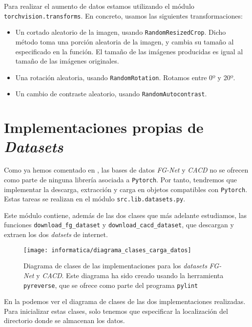 Para realizar el aumento de datos estamos utilizando el módulo \lstinline{torchvision.transforms}. En concreto, usamos las siguientes transformaciones:

\begin{itemize}
	\item Un cortado aleatorio de la imagen, usando \lstinline{RandomResizedCrop}. Dicho método toma una porción aleatoria de la imagen, y cambia su tamaño al especificado en la función. El tamaño de las imágenes producidas es igual al tamaño de las imágenes originales.
	\item Una rotación aleatoria, usando \lstinline{RandomRotation}. Rotamos entre 0º y 20º.
	\item Un cambio de contraste aleatorio, usando \lstinline{RandomAutocontrast}.
\end{itemize}

\section{Implementaciones propias de \textit{Datasets}} \label{isec:datasets_customs}

Como ya hemos comentado en , las bases de datos \textit{FG-Net} y \textit{CACD} no se ofrecen como parte de ninguna librería asociada a \lstinline{Pytorch}. Por tanto, tendremos que implementar la descarga, extracción y carga en objetos compatibles con \lstinline{Pytorch}. Estas tareas se realizan en el módulo \lstinline{src.lib.datasets.py}.

Este módulo contiene, además de las dos clases que más adelante estudiamos, las funciones \lstinline{download_fg_dataset} y \lstinline{download_cacd_dataset}, que descargan y extraen los dos \textit{datsets} de internet.

\begin{figure}[H]
	\centering
	\texttt{[image: informatica/diagrama\_clases\_carga\_datos]}
	\caption{Diagrama de clases de las implementaciones para los \textit{datasets} \textit{FG-Net} y \textit{CACD}. Este diagrama ha sido creado usando la herramienta \lstinline{pyreverse}, que se ofrece como parte del programa \lstinline{pylint}}
	\label{img:diagrama_clases_datasets}
\end{figure}

En la  podemos ver el diagrama de clases de las dos implementaciones realizadas. Para inicializar estas clases, solo tenemos que especificar la localización del directorio donde se almacenan los datos.

